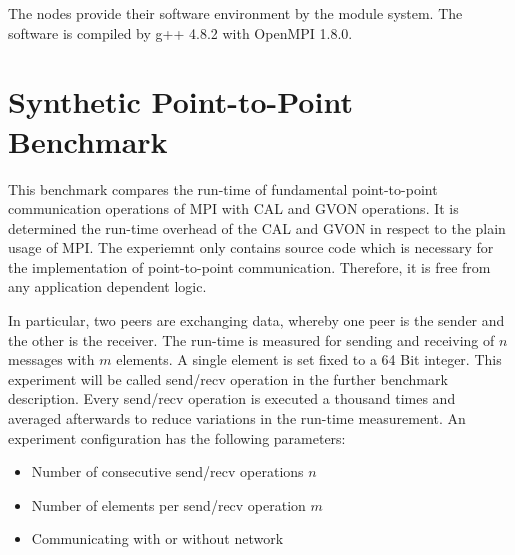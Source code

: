 

The nodes provide their software environment by the module system.
The software is compiled by g++ 4.8.2 with OpenMPI 1.8.0.

\section{Synthetic Point-to-Point Benchmark}
This benchmark compares the run-time of fundamental point-to-point
communication operations of MPI with CAL and GVON operations. It is
determined the run-time overhead of the CAL and GVON in respect to the
plain usage of MPI. The experiemnt only contains source code which is
necessary for the implementation of point-to-point
communication. Therefore, it is free from any application dependent
logic.

In particular, two peers are exchanging data, whereby one peer is the
sender and the other is the receiver. The run-time is measured for
sending and receiving of $n$ messages with $m$ elements.  A single
element is set fixed to a 64 Bit integer.  This experiment will be
called send/recv operation in the further benchmark description. Every
send/recv operation is executed a thousand times and averaged
afterwards to reduce variations in the run-time measurement. An
experiment configuration has the following parameters:

\begin{itemize}
  \item Number of consecutive send/recv operations $n$
  \item Number of elements per send/recv operation $m$
  \item Communicating with or without network
\end{itemize}

